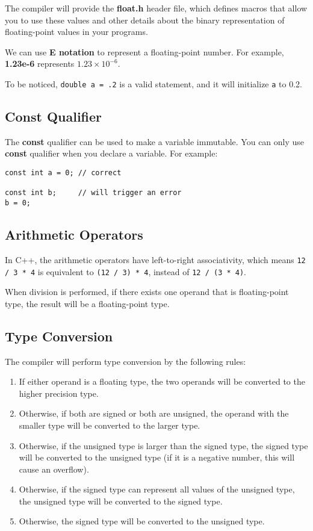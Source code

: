 \documentclass[a4paper,12pt]{article}
\begin{document}
The compiler will provide the \textbf{float.h} header file, which defines macros that allow you to use these values and other details about the binary representation of floating-point values in your programs.

We can use \textbf{E notation} to represent a floating-point number.
For example, \textbf{1.23e-6} represents $1.23 \times 10^{-6}$. 

To be noticed, \texttt{double a = .2} is a valid statement, and it will initialize \texttt{a} to 0.2.

\subsection{Const Qualifier}

The \textbf{const} qualifier can be used to make a variable immutable.
You can only use \textbf{const} qualifier when you declare a variable.
For example:
\begin{verbatim}
const int a = 0; // correct

const int b;     // will trigger an error
b = 0;
\end{verbatim}

\subsection{Arithmetic Operators}

In C++, the arithmetic operators have left-to-right associativity, which means \texttt{12 / 3 * 4} is equivalent to \texttt{(12 / 3) * 4}, instead of \texttt{12 / (3 * 4)}.

When division is performed, if there exists one operand that is floating-point type, the result will be a floating-point type.

\subsection{Type Conversion}

The compiler will perform type conversion by the following rules:
\begin{enumerate}
	\item If either operand is a floating type, the two operands will be converted to the higher precision type.
	\item Otherwise, if both are signed or both are unsigned, the operand with the smaller type will be converted to the larger type.
	\item Otherwise, if the unsigned type is larger than the signed type, the signed type will be converted to the unsigned type (if it is a negative number, this will cause an overflow).
	\item Otherwise, if the signed type can represent all values of the unsigned type, the unsigned type will be converted to the signed type.
	\item Otherwise, the signed type will be converted to the unsigned type.
\end{enumerate}
\end{document}
